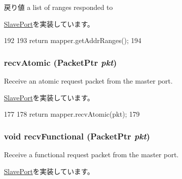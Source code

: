 \begin{DoxyReturn}{戻り値}
a list of ranges responded to 
\end{DoxyReturn}


\hyperlink{classSlavePort_a6e967f8921e80748eb2be35b6b481a7e}{SlavePort}を実装しています。


\begin{DoxyCode}
192         {
193             return mapper.getAddrRanges();
194         }
\end{DoxyCode}
\hypertarget{classAddrMapper_1_1MapperSlavePort_a5f0b4c4a94f6b0053f9d7a4eb9c2518a}{
\subsubsection[{recvAtomic}]{ recvAtomic ({\bf PacketPtr} {\em pkt})}}
\label{classAddrMapper_1_1MapperSlavePort_a5f0b4c4a94f6b0053f9d7a4eb9c2518a}
Receive an atomic request packet from the master port. 

\hyperlink{classSlavePort_a428ab07671bc9372dc44a2487b12a726}{SlavePort}を実装しています。


\begin{DoxyCode}
177         {
178             return mapper.recvAtomic(pkt);
179         }
\end{DoxyCode}
\hypertarget{classAddrMapper_1_1MapperSlavePort_aeefa907fb6d6a787e6dab90e8138ea90}{
\subsubsection[{recvFunctional}]{\setlength{\rightskip}{0pt plus 5cm}void recvFunctional ({\bf PacketPtr} {\em pkt})}}
\label{classAddrMapper_1_1MapperSlavePort_aeefa907fb6d6a787e6dab90e8138ea90}
Receive a functional request packet from the master port. 

\hyperlink{classSlavePort_a6a3d6f2e5dab6bed16d53d9e7c17378d}{SlavePort}を実装しています。



